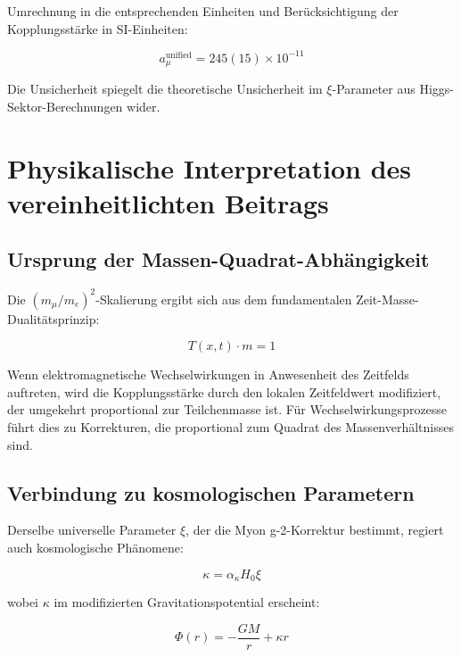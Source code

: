 \documentclass[12pt,a4paper]{article}
\newcommand{\Tfieldt}{T(x,t)}
\newcommand{\xipar}{\xi}
\begin{document}
	Umrechnung in die entsprechenden Einheiten und Berücksichtigung der Kopplungsstärke in SI-Einheiten:
	
	\begin{equation}
		a_\mu^{\text{unified}} = 245(15) \times 10^{-11}
	\end{equation}
	
	Die Unsicherheit spiegelt die theoretische Unsicherheit im $\xipar$-Parameter aus Higgs-Sektor-Berechnungen wider.
	
	\section{Physikalische Interpretation des vereinheitlichten Beitrags}
	
	\subsection{Ursprung der Massen-Quadrat-Abhängigkeit}
	\label{subsec:mass_squared_dependence}
	
	Die $(m_\mu/m_e)^2$-Skalierung ergibt sich aus dem fundamentalen Zeit-Masse-Dualitätsprinzip:
	
	\begin{equation}
		\Tfieldt \cdot m = 1
	\end{equation}
	
	Wenn elektromagnetische Wechselwirkungen in Anwesenheit des Zeitfelds auftreten, wird die Kopplungsstärke durch den lokalen Zeitfeldwert modifiziert, der umgekehrt proportional zur Teilchenmasse ist. Für Wechselwirkungsprozesse führt dies zu Korrekturen, die proportional zum Quadrat des Massenverhältnisses sind.
	
	\subsection{Verbindung zu kosmologischen Parametern}
	\label{subsec:cosmological_connection}
	
	Derselbe universelle Parameter $\xipar$, der die Myon g-2-Korrektur bestimmt, regiert auch kosmologische Phänomene:
	
	\begin{equation}
		\kappa = \alpha_\kappa H_0 \xipar
	\end{equation}
	
	wobei $\kappa$ im modifizierten Gravitationspotential erscheint:
	
	\begin{equation}
		\Phi(r) = -\frac{GM}{r} + \kappa r
	\end{equation}
	
\end{document}
